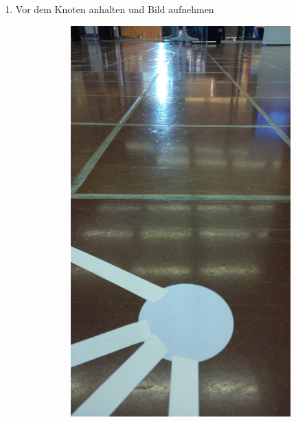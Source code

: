 \begin{enumerate}
    \item Vor dem Knoten anhalten und Bild aufnehmen


    \begin{figure}[H]
        \centering
        \begin{subfigure}{0.25\textwidth}
        \centering
        \includegraphics[width=0.95\linewidth]{assets/informatik-prototyp/opencv/angle_detection/image_taken_by_pi_camer_before_node.jpg}

\end{subfigure}
\end{figure}
\end{enumerate}

